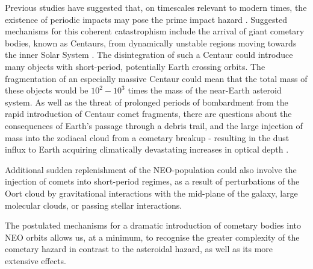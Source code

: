 Previous studies have suggested that, on timescales relevant to modern times, the existence of periodic impacts may pose the prime impact hazard \citep{ASHER19941}. Suggested mechanisms for this coherent catastrophism include the arrival of giant cometary bodies, known as Centaurs, from dynamically unstable regions moving towards the inner Solar System \citep{2015A&G....56f6.24N}. The disintegration of such a Centaur could introduce many objects with short-period, potentially Earth crossing orbits. The fragmentation of an especially massive Centaur could mean that the total mass of these objects would be $10^{2}-10^{3}$ times the mass of the near-Earth asteroid system. As well as the threat of prolonged periods of bombardment from the rapid introduction of Centaur comet fragments, there are questions about the consequences of Earth's passage through a debris trail, and the large injection of mass into the zodiacal cloud from a cometary breakup - resulting in the dust influx to Earth acquiring climatically devastating increases in optical depth \citep{2001MNRAS.321..463N, 2015MNRAS.448...27N}.

Additional sudden replenishment of the NEO-population could also involve the injection of comets into short-period regimes, as a result of perturbations of the Oort cloud by gravitational interactions with the mid-plane of the galaxy, large molecular clouds, or passing stellar interactions.

The postulated mechanisms for a dramatic introduction of cometary bodies into NEO orbits allows us, at a minimum, to recognise the greater complexity of the cometary hazard in contrast to the asteroidal hazard, as well as its more extensive effects.






